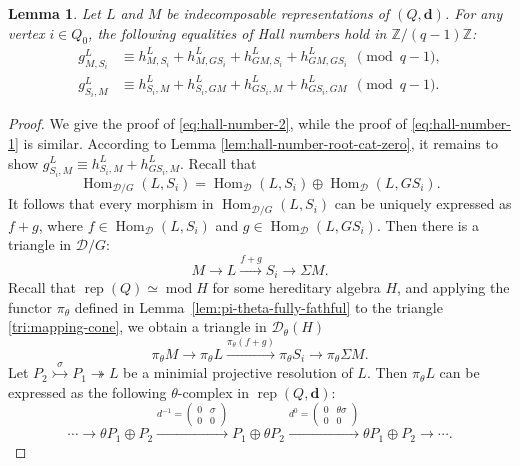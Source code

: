 \documentclass[12pt,reqno]{amsart}
\numberwithin{equation}{section}
\renewcommand{\mod}{\operatorname{mod}\nolimits}
\newcommand{\rep}{\operatorname{rep}\nolimits}
\newcommand{\Hom}{\operatorname{Hom}\nolimits}
\newtheorem{lemma}[theorem]{Lemma}
\begin{document}
	\begin{lemma} \label{lem:equ-Hall-num}
		Let $L$ and $M$ be indecomposable representations of $(Q,\mathbf{d})$. For any vertex $i\in Q_0$, the following equalities of Hall numbers hold in $\mathbb{Z}/(q-1)\mathbb{Z}$:
		\begin{align} 
			g_{{M},{S_i}}
			^{L}
			&\equiv h_{M,{S_i}}^L+h_{M,G{S_i}}^L+h_{GM,{S_i}}^L
			+h_{GM,G{S_i}}^L \ \  \pmod{q-1} \label{eq:hall-number-1},  \\
			g_{S_i,M}
			^{{L}} &\equiv h_{{S_i},M}^L+h_{{S_i},GM}^L+h_{G{S_i},M}^L+h_{G{S_i},GM}^L\ \  \pmod{q-1}.\label{eq:hall-number-2}
		\end{align}
		
	\end{lemma}
	\begin{proof}
		We give the proof of \eqref{eq:hall-number-2}, while the proof of \eqref{eq:hall-number-1} is similar. According to Lemma \ref{lem:hall-number-root-cat-zero}, it remains to show $g_{S_i,M}^L\equiv h_{S_i,M}^L+h_{GS_i,M}^L$.
		Recall that \[\Hom_{\mathcal{D}/G}(L,S_i)=\Hom_{\mathcal{D}}(L,S_i)\oplus \Hom_{\mathcal{D}}(L,GS_i).\] It follows that every morphism in $\Hom_{\mathcal{D}/G}(L,S_i)$ can be uniquely expressed as $f+g$, where $f\in \Hom_{\mathcal{D}}(L,S_i)$ and $g\in \Hom_{\mathcal{D}}(L,GS_i)$. Then there is a triangle in $\mathcal{D}/G$:
		\begin{equation}\label{tri:mapping-cone}
			M\longrightarrow L\xrightarrow{f+g} S_i\longrightarrow \Sigma M. 
		\end{equation}
		Recall that $\rep(Q)\simeq \mod H$ for some hereditary algebra $H$, and applying the functor $\pi_\theta$ defined in Lemma~\ref{lem:pi-theta-fully-fathful} to the triangle \eqref{tri:mapping-cone}, we obtain a triangle in $\mathcal{D}_\theta(H)$
		\begin{equation}\label{tri-DA-fg}
			\pi_\theta M\longrightarrow \pi_\theta L\xrightarrow{\pi_\theta(f+g)} \pi_\theta S_i\longrightarrow \pi_\theta \Sigma M.
		\end{equation}
		Let $P_2\stackrel{\sigma}{\rightarrowtail} P_1\twoheadrightarrow L$ be a minimial projective resolution of $L$. Then $\pi_\theta L$ can be expressed as the following $\theta$-complex in $\rep(Q,\mathbf{d})$:
		\[
		\cdots\rightarrow \theta P_1\oplus P_2\xrightarrow{d^{-1}=\begin{pmatrix}0&\sigma \\ 0&0\end{pmatrix}} P_1\oplus \theta P_2\xrightarrow{d^0=\begin{pmatrix}0&\theta \sigma \\ 0&0\end{pmatrix}}\theta P_1\oplus P_2\rightarrow \cdots.
\]
\end{proof}
\end{document}
